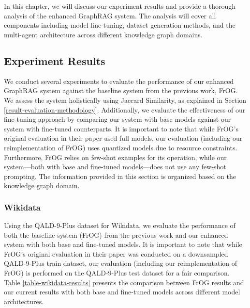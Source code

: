 \chapter{\babLima}
\label{bab:5}

In this chapter, we will discuss our experiment results and provide a thorough analysis of the enhanced GraphRAG system. The analysis will cover all components including model fine-tuning, dataset generation methods, and the multi-agent architecture across different knowledge graph domains.

\section{Experiment Results}
We conduct several experiments to evaluate the performance of our enhanced GraphRAG system against the baseline system from the previous work, FrOG. We assess the system holistically using Jaccard Similarity, as explained in Section \ref{result-evaluation-methodology}. Additionally, we evaluate the effectiveness of our fine-tuning approach by comparing our system with base models against our system with fine-tuned counterparts. It is important to note that while FrOG's original evaluation in their paper used full models, our evaluation (including our reimplementation of FrOG) uses quantized models due to resource constraints. Furthermore, FrOG relies on few-shot examples for its operation, while our system---both with base and fine-tuned models---does not use any few-shot prompting. The information provided in this section is organized based on the knowledge graph domain.

\subsection{Wikidata}
\label{wikidata-results}

Using the QALD-9-Plus dataset for Wikidata, we evaluate the performance of both the baseline system (FrOG) from the previous work and our enhanced system with both base and fine-tuned models. It is important to note that while FrOG's original evaluation in their paper was conducted on a downsampled QALD-9-Plus train dataset, our evaluation (including our reimplementation of FrOG) is performed on the QALD-9-Plus test dataset for a fair comparison. Table \ref{table-wikidata-results} presents the comparison between FrOG results and our current results with both base and fine-tuned models across different model architectures.

